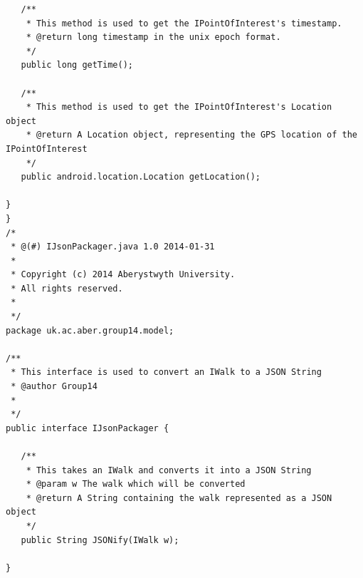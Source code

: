 \documentclass{project}
\begin{document}
\begin{verbatim}
   /**
    * This method is used to get the IPointOfInterest's timestamp.
    * @return long timestamp in the unix epoch format.
    */
   public long getTime();
   
   /**
    * This method is used to get the IPointOfInterest's Location object
    * @return A Location object, representing the GPS location of the IPointOfInterest
    */
   public android.location.Location getLocation();
   
}
}
/*
 * @(#) IJsonPackager.java 1.0 2014-01-31
 *
 * Copyright (c) 2014 Aberystwyth University.
 * All rights reserved.
 *
 */
package uk.ac.aber.group14.model;

/**
 * This interface is used to convert an IWalk to a JSON String
 * @author Group14
 *
 */
public interface IJsonPackager {
   
   /**
    * This takes an IWalk and converts it into a JSON String
    * @param w The walk which will be converted
    * @return A String containing the walk represented as a JSON object
    */
   public String JSONify(IWalk w);
   
}
\end{verbatim}

\newpage
\end{document}
